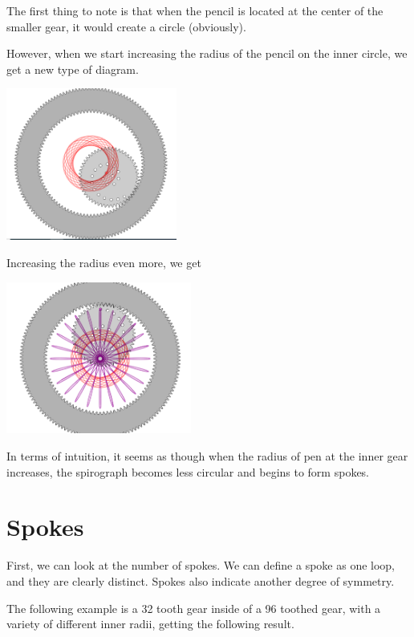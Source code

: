 \documentclass{article}
\begin{document}
The first thing to note is that when the pencil is located at the center of the smaller gear, it would create a circle (obviously).

However, when we start increasing the radius of the pencil on the inner circle, we get a new type of diagram. 

\begin{center}
\includegraphics[height=5cm]{images/IncreaseRad1.png}
\end{center}

Increasing the radius even more, we get 

\begin{center}
\includegraphics[height=5cm]{images/MaxRad2.png}
\end{center}

In terms of intuition, it seems as though when the radius of pen at the inner gear increases, the spirograph becomes less circular and begins to form spokes.

\section{Spokes}

First, we can look at the number of spokes. We can define a spoke as one loop, and they are clearly distinct. Spokes also indicate another degree of symmetry.

The following example is a 32 tooth gear inside of a 96 toothed gear, with a variety of different inner radii, getting the following result. 
\end{document}
